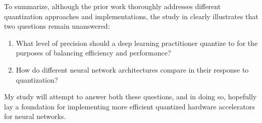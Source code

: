 \documentclass[twocolumn]{article}
\begin{document}
To summarize, although the prior work thoroughly addresses different
quantization approaches and implementations, the study in
\cite{gholami2021survey} clearly illustrates that two questions remain unanswered:
\begin{enumerate}
    \item What level of precision should a deep learning practitioner quantize
    to for the purposes of balancing efficiency and performance?
    \item How do different neural network architectures compare in their
    response to quantization?
\end{enumerate}

My study will attempt to answer both these questions, and in doing so, hopefully
lay a foundation for implementing more efficient quantized hardware accelerators
for neural networks.

\printbibliography
\end{document}
